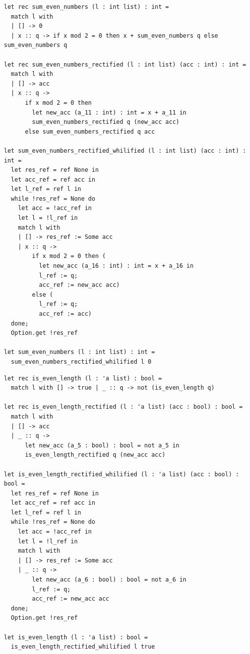 \begin{verbatim}
let rec sum_even_numbers (l : int list) : int =
  match l with
  | [] -> 0
  | x :: q -> if x mod 2 = 0 then x + sum_even_numbers q else sum_even_numbers q

let rec sum_even_numbers_rectified (l : int list) (acc : int) : int =
  match l with
  | [] -> acc
  | x :: q ->
      if x mod 2 = 0 then
        let new_acc (a_11 : int) : int = x + a_11 in
        sum_even_numbers_rectified q (new_acc acc)
      else sum_even_numbers_rectified q acc

let sum_even_numbers_rectified_whilified (l : int list) (acc : int) : int =
  let res_ref = ref None in
  let acc_ref = ref acc in
  let l_ref = ref l in
  while !res_ref = None do
    let acc = !acc_ref in
    let l = !l_ref in
    match l with
    | [] -> res_ref := Some acc
    | x :: q ->
        if x mod 2 = 0 then (
          let new_acc (a_16 : int) : int = x + a_16 in
          l_ref := q;
          acc_ref := new_acc acc)
        else (
          l_ref := q;
          acc_ref := acc)
  done;
  Option.get !res_ref

let sum_even_numbers (l : int list) : int =
  sum_even_numbers_rectified_whilified l 0
\end{verbatim}

\begin{verbatim}
let rec is_even_length (l : 'a list) : bool =
  match l with [] -> true | _ :: q -> not (is_even_length q)

let rec is_even_length_rectified (l : 'a list) (acc : bool) : bool =
  match l with
  | [] -> acc
  | _ :: q ->
      let new_acc (a_5 : bool) : bool = not a_5 in
      is_even_length_rectified q (new_acc acc)

let is_even_length_rectified_whilified (l : 'a list) (acc : bool) : bool =
  let res_ref = ref None in
  let acc_ref = ref acc in
  let l_ref = ref l in
  while !res_ref = None do
    let acc = !acc_ref in
    let l = !l_ref in
    match l with
    | [] -> res_ref := Some acc
    | _ :: q ->
        let new_acc (a_6 : bool) : bool = not a_6 in
        l_ref := q;
        acc_ref := new_acc acc
  done;
  Option.get !res_ref

let is_even_length (l : 'a list) : bool =
  is_even_length_rectified_whilified l true
\end{verbatim}

